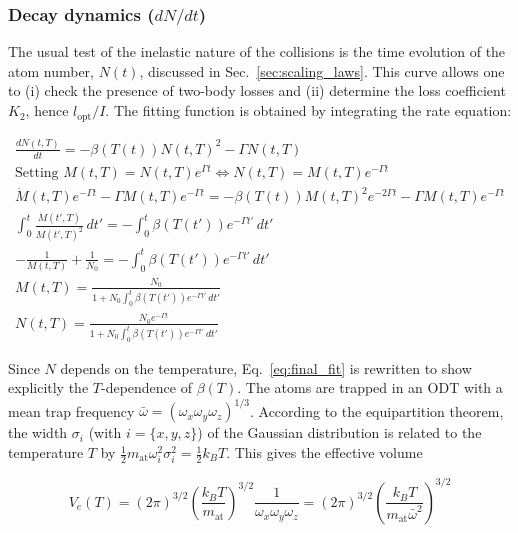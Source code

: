\subsubsection{Decay dynamics ($dN/dt$)}
\label{decay dynamics}
The usual test of the inelastic nature of the collisions is the time evolution of the atom number, $N(t)$, discussed in Sec.~\ref{sec:scaling_laws}. This curve allows one to (i) check the presence of two-body losses and (ii)
determine the loss coefficient $K_2$, hence $l_{\text{opt}}/I$. The fitting function is obtained by integrating the rate equation:

\begin{gather}
    \frac{dN(t,T)}{dt} = -\beta(T(t)) N(t,T)^2 - \Gamma N(t,T) \label{eq globale collisions} \\[1.5ex]
    \text{Setting } M(t,T) = N(t,T)e^{\Gamma t} \iff N(t,T) = M(t,T)e^{-\Gamma t} \label{eq:change_var} \\[1.5ex]
    \dot{M}(t,T)e^{-\Gamma t} - \Gamma M(t,T) e^{-\Gamma t} = -\beta(T(t)) M(t,T)^2 e^{-2\Gamma t} - \Gamma M(t,T) e^{-\Gamma t} \label{eq:diff} \\[1.5ex]
    \int_{0}^{t} \frac{\dot{M}(t',T)}{M(t',T)^2} \, dt' = -\int_{0}^{t} \beta(T(t')) e^{-\Gamma t'} \, dt' \label{eq:integ} \\[1.5ex]
    -\frac{1}{M(t,T)} + \frac{1}{N_0} = -\int_{0}^{t} \beta(T(t')) e^{-\Gamma t'} \, dt' \label{eq:inv_M} \\[1.5ex]
    M(t,T) = \frac{N_0}{1 + N_0 \int_{0}^{t} \beta(T(t')) e^{-\Gamma t'} \, dt'} \label{eq:sol_M} \\[1.5ex]
    N(t,T) = \frac{N_0 e^{-\Gamma t}}{1 + N_0 \int_{0}^{t} \beta(T(t')) e^{-\Gamma t'} \, dt'} \label{eq:final_fit}
\end{gather}

Since $N$ depends on the temperature, Eq.~\ref{eq:final_fit} is rewritten to show explicitly the $T$-dependence of $\beta(T)$. The atoms are trapped in an ODT with a mean trap frequency
$\bar{\omega} = (\omega_x \omega_y \omega_z)^{1/3}$. According to the equipartition theorem, the width $\sigma_{i}$ (with $i=\{x,y,z\}$) of the Gaussian distribution is related to the temperature $T$ by
$\frac{1}{2}m_{\text{at}}\omega_{i}^2\sigma_{i}^2 = \frac{1}{2}k_B T$. This gives the effective volume

\begin{equation}
    V_e(T) = (2\pi)^{3/2}\left(\frac{k_B T}{m_{\text{at}}}\right)^{3/2} \frac{1}{\omega_x\omega_y\omega_z} = (2\pi)^{3/2}\left(\frac{k_B T}{m_{\text{at}}\bar{\omega}^2}\right)^{3/2}
\end{equation}


